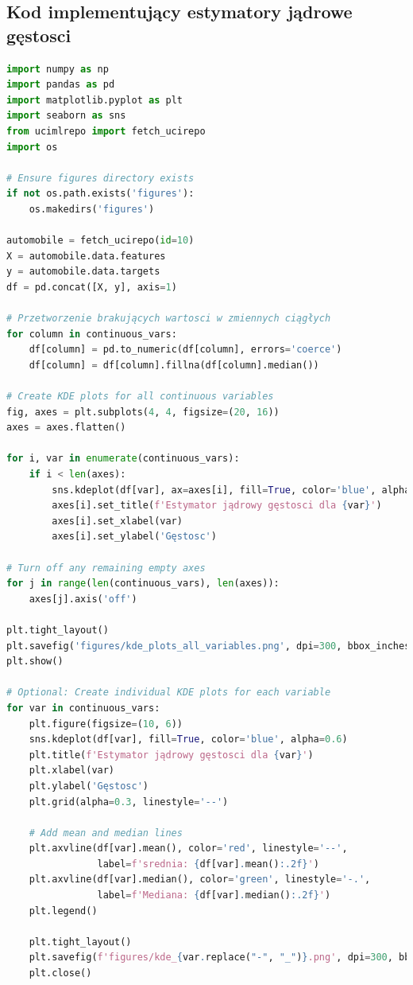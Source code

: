 \documentclass[12pt,a4paper]{article}
\begin{document}
\subsection{Kod implementujący estymatory jądrowe gęstosci}
\begin{lstlisting}[language=Python, caption=Kod generujący estymatory jądrowe gęstosci]
import numpy as np
import pandas as pd
import matplotlib.pyplot as plt
import seaborn as sns
from ucimlrepo import fetch_ucirepo
import os

# Ensure figures directory exists
if not os.path.exists('figures'):
    os.makedirs('figures')

automobile = fetch_ucirepo(id=10)
X = automobile.data.features
y = automobile.data.targets
df = pd.concat([X, y], axis=1)

# Przetworzenie brakujących wartosci w zmiennych ciągłych
for column in continuous_vars:
    df[column] = pd.to_numeric(df[column], errors='coerce')
    df[column] = df[column].fillna(df[column].median())

# Create KDE plots for all continuous variables
fig, axes = plt.subplots(4, 4, figsize=(20, 16))
axes = axes.flatten()

for i, var in enumerate(continuous_vars):
    if i < len(axes):
        sns.kdeplot(df[var], ax=axes[i], fill=True, color='blue', alpha=0.6)
        axes[i].set_title(f'Estymator jądrowy gęstosci dla {var}')
        axes[i].set_xlabel(var)
        axes[i].set_ylabel('Gęstosc')

# Turn off any remaining empty axes
for j in range(len(continuous_vars), len(axes)):
    axes[j].axis('off')

plt.tight_layout()
plt.savefig('figures/kde_plots_all_variables.png', dpi=300, bbox_inches='tight')
plt.show()

# Optional: Create individual KDE plots for each variable 
for var in continuous_vars:
    plt.figure(figsize=(10, 6))
    sns.kdeplot(df[var], fill=True, color='blue', alpha=0.6)
    plt.title(f'Estymator jądrowy gęstosci dla {var}')
    plt.xlabel(var)
    plt.ylabel('Gęstosc')
    plt.grid(alpha=0.3, linestyle='--')
    
    # Add mean and median lines
    plt.axvline(df[var].mean(), color='red', linestyle='--', 
                label=f'srednia: {df[var].mean():.2f}')
    plt.axvline(df[var].median(), color='green', linestyle='-.',
                label=f'Mediana: {df[var].median():.2f}')
    plt.legend()
    
    plt.tight_layout()
    plt.savefig(f'figures/kde_{var.replace("-", "_")}.png', dpi=300, bbox_inches='tight')
    plt.close()
\end{lstlisting}
\end{document}

